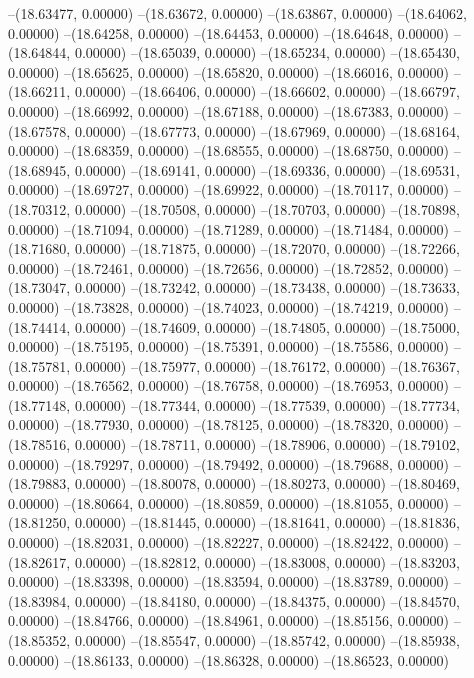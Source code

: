 --(18.63477, 0.00000)
--(18.63672, 0.00000)
--(18.63867, 0.00000)
--(18.64062, 0.00000)
--(18.64258, 0.00000)
--(18.64453, 0.00000)
--(18.64648, 0.00000)
--(18.64844, 0.00000)
--(18.65039, 0.00000)
--(18.65234, 0.00000)
--(18.65430, 0.00000)
--(18.65625, 0.00000)
--(18.65820, 0.00000)
--(18.66016, 0.00000)
--(18.66211, 0.00000)
--(18.66406, 0.00000)
--(18.66602, 0.00000)
--(18.66797, 0.00000)
--(18.66992, 0.00000)
--(18.67188, 0.00000)
--(18.67383, 0.00000)
--(18.67578, 0.00000)
--(18.67773, 0.00000)
--(18.67969, 0.00000)
--(18.68164, 0.00000)
--(18.68359, 0.00000)
--(18.68555, 0.00000)
--(18.68750, 0.00000)
--(18.68945, 0.00000)
--(18.69141, 0.00000)
--(18.69336, 0.00000)
--(18.69531, 0.00000)
--(18.69727, 0.00000)
--(18.69922, 0.00000)
--(18.70117, 0.00000)
--(18.70312, 0.00000)
--(18.70508, 0.00000)
--(18.70703, 0.00000)
--(18.70898, 0.00000)
--(18.71094, 0.00000)
--(18.71289, 0.00000)
--(18.71484, 0.00000)
--(18.71680, 0.00000)
--(18.71875, 0.00000)
--(18.72070, 0.00000)
--(18.72266, 0.00000)
--(18.72461, 0.00000)
--(18.72656, 0.00000)
--(18.72852, 0.00000)
--(18.73047, 0.00000)
--(18.73242, 0.00000)
--(18.73438, 0.00000)
--(18.73633, 0.00000)
--(18.73828, 0.00000)
--(18.74023, 0.00000)
--(18.74219, 0.00000)
--(18.74414, 0.00000)
--(18.74609, 0.00000)
--(18.74805, 0.00000)
--(18.75000, 0.00000)
--(18.75195, 0.00000)
--(18.75391, 0.00000)
--(18.75586, 0.00000)
--(18.75781, 0.00000)
--(18.75977, 0.00000)
--(18.76172, 0.00000)
--(18.76367, 0.00000)
--(18.76562, 0.00000)
--(18.76758, 0.00000)
--(18.76953, 0.00000)
--(18.77148, 0.00000)
--(18.77344, 0.00000)
--(18.77539, 0.00000)
--(18.77734, 0.00000)
--(18.77930, 0.00000)
--(18.78125, 0.00000)
--(18.78320, 0.00000)
--(18.78516, 0.00000)
--(18.78711, 0.00000)
--(18.78906, 0.00000)
--(18.79102, 0.00000)
--(18.79297, 0.00000)
--(18.79492, 0.00000)
--(18.79688, 0.00000)
--(18.79883, 0.00000)
--(18.80078, 0.00000)
--(18.80273, 0.00000)
--(18.80469, 0.00000)
--(18.80664, 0.00000)
--(18.80859, 0.00000)
--(18.81055, 0.00000)
--(18.81250, 0.00000)
--(18.81445, 0.00000)
--(18.81641, 0.00000)
--(18.81836, 0.00000)
--(18.82031, 0.00000)
--(18.82227, 0.00000)
--(18.82422, 0.00000)
--(18.82617, 0.00000)
--(18.82812, 0.00000)
--(18.83008, 0.00000)
--(18.83203, 0.00000)
--(18.83398, 0.00000)
--(18.83594, 0.00000)
--(18.83789, 0.00000)
--(18.83984, 0.00000)
--(18.84180, 0.00000)
--(18.84375, 0.00000)
--(18.84570, 0.00000)
--(18.84766, 0.00000)
--(18.84961, 0.00000)
--(18.85156, 0.00000)
--(18.85352, 0.00000)
--(18.85547, 0.00000)
--(18.85742, 0.00000)
--(18.85938, 0.00000)
--(18.86133, 0.00000)
--(18.86328, 0.00000)
--(18.86523, 0.00000)
